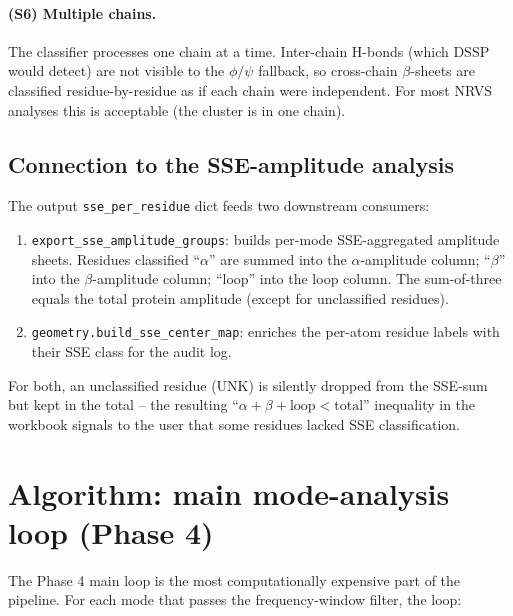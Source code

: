 \documentclass[10pt,a4paper,twoside]{article}
\newcommand{\codref}[1]{%
  \quad\text{\textcolor{gray!70!black}{\footnotesize $\rightsquigarrow$~\texttt{#1}}}}
\newcommand{\fn}[1]{\texttt{#1}}
\begin{document}
\paragraph{(S6) Multiple chains.}
The classifier processes one chain at a time. Inter-chain
H-bonds (which DSSP would detect) are not visible to the
$\phi/\psi$ fallback, so cross-chain $\beta$-sheets are
classified residue-by-residue as if each chain were independent.
For most NRVS analyses this is acceptable (the cluster is in one
chain).

\subsection{Connection to the SSE-amplitude analysis}

The output \texttt{sse\_per\_residue} dict feeds two downstream
consumers:

\begin{enumerate}
  \item \texttt{export\_sse\_amplitude\_groups}: builds per-mode
        SSE-aggregated amplitude sheets. Residues classified
        ``$\alpha$'' are summed into the $\alpha$-amplitude column;
        ``$\beta$'' into the $\beta$-amplitude column; ``loop'' into
        the loop column. The sum-of-three equals the total
        protein amplitude (except for unclassified residues).
  \item \fn{geometry.build\_sse\_center\_map}: enriches the
        per-atom residue labels with their SSE class for the audit
        log.
\end{enumerate}

For both, an unclassified residue (UNK) is silently dropped from
the SSE-sum but kept in the total -- the resulting ``$\alpha + \beta
+ \text{loop} < \text{total}$'' inequality in the workbook signals
to the user that some residues lacked SSE classification.

\section{Algorithm: main mode-analysis loop (Phase 4)}
\label{sec:algo-mode-loop}

\codref{runner.\_run\_analysis\_single}

The Phase 4 main loop is the most computationally expensive part of
the pipeline. For each mode that passes the frequency-window filter,
the loop:
\end{document}
